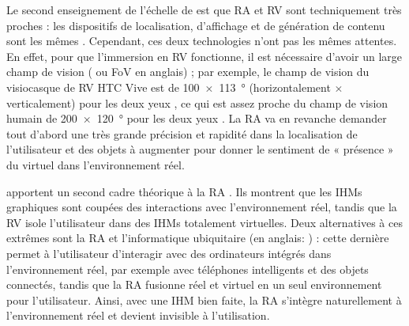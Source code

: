 Le second enseignement de l'échelle de \citeauthor{Milgram1994} est que RA et RV sont techniquement très proches : les dispositifs de localisation, d'affichage et de génération de contenu sont les mêmes \citep{Billinghurst2015}. Cependant, ces deux technologies n'ont pas les mêmes attentes. En effet, pour que l'immersion en RV fonctionne, il est nécessaire d'avoir un large champ de vision ( ou FoV en anglais) ; par exemple, le champ de vision du visiocasque de RV HTC Vive est de \SI{100x113}{\degree} (horizontalement $\times$ verticalement) pour les deux yeux \citep{Kreylos2016}, ce qui est assez proche du champ de vision humain de \SI{200x120}{\degree} pour les deux yeux \citep{Cockburn2008}. La RA va en revanche demander tout d'abord une très grande précision et rapidité dans la localisation de l'utilisateur et des objets à augmenter pour donner le sentiment de « présence » du virtuel dans l'environnement réel.


\cite{Rekimoto1995} apportent un second cadre théorique à la RA . Ils montrent que les IHMs graphiques sont coupées des interactions avec l'environnement réel, tandis que la RV isole l'utilisateur dans des IHMs totalement virtuelles. Deux alternatives à ces extrêmes sont la RA et l'informatique ubiquitaire (en anglais: ) : cette dernière permet à l'utilisateur d'interagir avec des ordinateurs intégrés dans l'environnement réel, par exemple avec téléphones intelligents et des objets connectés, tandis que la RA fusionne réel et virtuel en un seul environnement pour l'utilisateur. Ainsi, avec une IHM bien faite, la RA s'intègre naturellement à l'environnement réel et devient invisible à l'utilisation.

